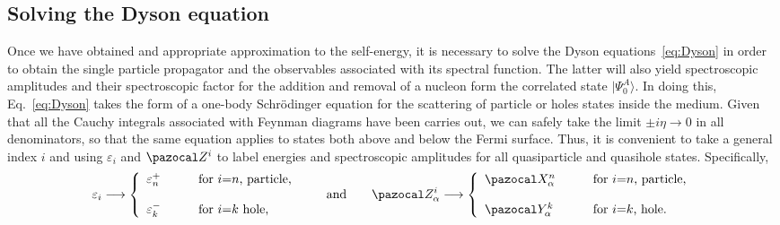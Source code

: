  
 
\subsection{Solving the Dyson equation}

 Once we have obtained and  appropriate approximation to the self-energy, it is necessary to solve the Dyson equations~\eqref{eq:Dyson} in order
 to obtain the single particle propagator and the observables associated with its spectral function. The latter will also yield spectroscopic amplitudes and their spectroscopic factor for the addition and removal of a nucleon form the correlated state $|\Psi^A_0\rangle$.  In doing this, Eq.~\eqref{eq:Dyson} takes the form of a one-body Schr\"odinger equation for the scattering of particle or holes states inside the medium. Given that all the Cauchy integrals associated with Feynman diagrams have been carries out, we can safely take the limit $\pm i \eta \rightarrow 0$ in all denominators, so that the same equation applies to states both above and below the Fermi surface. 
 Thus, it is convenient to take a general index $i$ and using $\varepsilon_i$ and $\pazocal Z^i$ to label energies and spectroscopic amplitudes for all quasiparticle and quasihole states. Specifically,
 \begin{equation}
\varepsilon_i \longrightarrow \left\{
\begin{array}{lcl}
\varepsilon_n^+ & \quad & \hbox{for $i$=$n$, particle,}  \\ ~ \\
\varepsilon_k^- &  & \hbox{for $i$=$k$ hole,} 
\end{array} \right.
\qquad \hbox{and} \qquad 
\pazocal Z^i_\alpha  \longrightarrow \left\{
\begin{array}{lcl}
\pazocal X^n_\alpha & \quad & \hbox{for $i$=$n$, particle,} \\ ~ \\
\pazocal Y^k_\alpha &  & \hbox{for $i$=$k$, hole.} 
\end{array} \right.
\label{eq:Z_ampl}
\end{equation}

